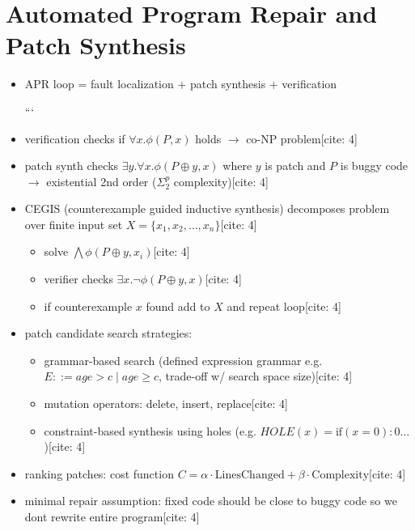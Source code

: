 \documentclass[11pt]{book}
\begin{document}
\setcounter{chapter}{5}
\chapter{Automated Program Repair and Patch Synthesis}

\begin{itemize}
\item APR loop = fault localization + patch synthesis + verification

```
\item verification checks if $\forall x.\phi(P,x)$ holds $\rightarrow$ co-NP problem[cite: 4]

\item patch synth checks $\exists y.\forall x.\phi(P\oplus y,x)$ where $y$ is patch and $P$ is buggy code $\rightarrow$ existential 2nd order ($\Sigma_2^p$ complexity)[cite: 4]

\item CEGIS (counterexample guided inductive synthesis) decomposes problem over finite input set $X=\{x_1,x_2,\dots,x_n\}$[cite: 4]
\begin{itemize}
    \item solve $\bigwedge \phi(P\oplus y, x_i)$[cite: 4]
    \item verifier checks $\exists x.\neg \phi(P\oplus y, x)$[cite: 4]
    \item if counterexample $x$ found add to $X$ and repeat loop[cite: 4]
\end{itemize}

\item patch candidate search strategies:
\begin{itemize}
    \item grammar-based search (defined expression grammar e.g. $E ::= age > c \mid age \ge c$, trade-off w/ search space size)[cite: 4]
    \item mutation operators: delete, insert, replace[cite: 4]
    \item constraint-based synthesis using holes (e.g. $HOLE(x) = \text{if}(x=0):0 \dots$)[cite: 4]
\end{itemize}

\item ranking patches: cost function $C = \alpha \cdot \text{LinesChanged} + \beta \cdot \text{Complexity}$[cite: 4]

\item minimal repair assumption: fixed code should be close to buggy code so we dont rewrite entire program[cite: 4]


\end{itemize}
\end{document}
